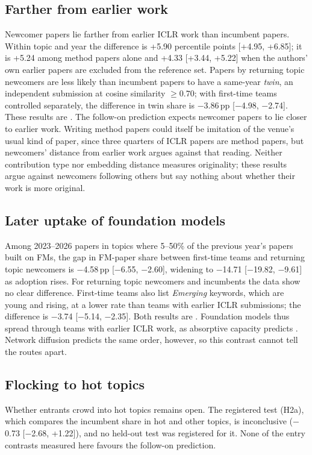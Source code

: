 \subsection{Farther from earlier work}
Newcomer papers lie farther from earlier ICLR work than incumbent papers. Within topic and year the difference is
+5.90 percentile points [+4.95, +6.85]; it is +5.24 among method papers alone and +4.33 [+3.44, +5.22] when the
authors' own earlier papers are excluded from the reference set. Papers by returning topic newcomers are less likely
than incumbent papers to have a same-year \emph{twin}, an independent submission at cosine similarity $\geq 0.70$; with
first-time teams controlled separately, the difference in twin share is $-$3.86\,pp [$-$4.98, $-$2.74]. These results
are . The follow-on prediction expects newcomer papers to lie closer to earlier work. Writing method
papers could itself be imitation of the venue's usual kind of paper, since three quarters of ICLR papers are method
papers, but newcomers' distance from earlier work argues against that reading. Neither contribution type nor embedding
distance measures originality; these results argue against newcomers following others but say nothing about whether
their work is more original.

\subsection{Later uptake of foundation models}
Among 2023--2026 papers in topics where 5--50\% of the previous year's papers built on FMs, the gap in FM-paper share
between first-time teams and returning topic newcomers is $-$4.58\,pp [$-$6.55, $-$2.60], widening to $-$14.71
[$-$19.82, $-$9.61] as adoption rises. For returning topic newcomers and incumbents the data show no clear difference.
First-time teams also list \emph{Emerging} keywords, which are young and rising, at a lower rate than teams with earlier
ICLR submissions; the difference is $-$3.74 [$-$5.14, $-$2.35]. Both results are . Foundation models
thus spread through teams with earlier ICLR work, as absorptive capacity predicts \citep{cohen1990absorptive}. Network
diffusion predicts the same order, however, so this contrast cannot tell the routes apart.

\subsection{Flocking to hot topics}
Whether entrants crowd into hot topics remains open. The registered test (H2a), which compares the incumbent share in
hot and other topics, is inconclusive ($-$0.73 [$-$2.68, +1.22]), and no held-out test was registered for it. None of
the entry contrasts measured here favours the follow-on prediction.

